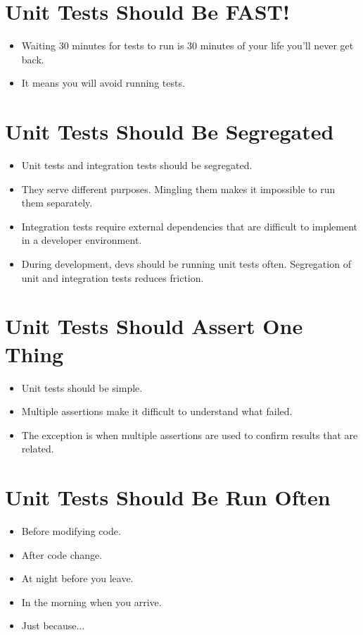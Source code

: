 \documentclass{article}
\begin{document}
\newpage
\section{Unit Tests Should Be FAST!}
\begin{itemize}
    \item Waiting 30 minutes for tests to run is 30 minutes of your life you'll
        never get back.
    \item It means you will avoid running tests.
\end{itemize}

\newpage
\section{Unit Tests Should Be Segregated}
\begin{itemize}
    \item Unit tests and integration tests should be segregated.
    \item They serve different purposes. Mingling them makes it impossible to
        run them separately.
    \item Integration tests require external dependencies that are difficult to
        implement in a developer environment.
    \item During development, devs should be running unit tests often. Segregation
        of unit and integration tests reduces friction.
\end{itemize}

\newpage
\section{Unit Tests Should Assert One Thing}
\begin{itemize}
    \item Unit tests should be simple.
    \item Multiple assertions make it difficult to understand what failed.
    \item The exception is when multiple assertions are used to confirm results
        that are related.
\end{itemize}

\newpage
\section{Unit Tests Should Be Run Often}
\begin{itemize}
    \item Before modifying code.
    \item After code change.
    \item At night before you leave.
    \item In the morning when you arrive.
    \item Just because...
\end{itemize}
\end{document}
